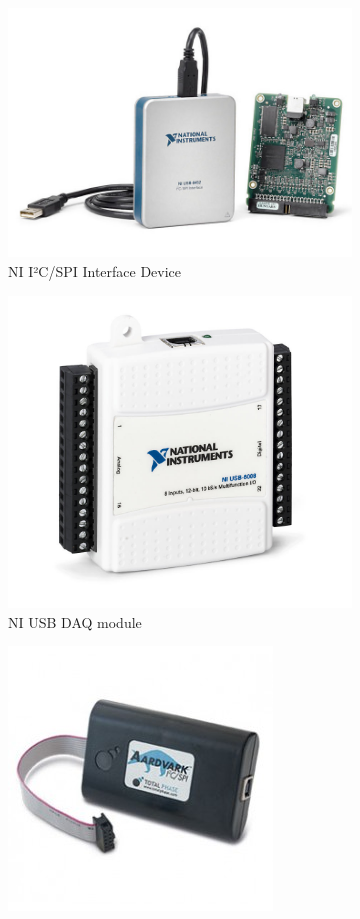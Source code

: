 \begin{figure}
	\centering
	\begin{subfigure}{.5\textwidth}
		\centering
		\includegraphics[width=.8\linewidth]{img/ni-i2c-device.jpg}
		\caption{NI I²C/SPI Interface Device}
	\end{subfigure}%
	\begin{subfigure}{.5\textwidth}
		\centering
		\includegraphics[width=.8\linewidth]{img/nidaq.jpg}
		\caption{NI USB DAQ module}
	\end{subfigure}
	\begin{subfigure}{.5\textwidth}
		\centering
		\includegraphics[width=.8\linewidth]{img/total-phase-spi-i2c.jpg}

\end{subfigure}
\end{figure}
